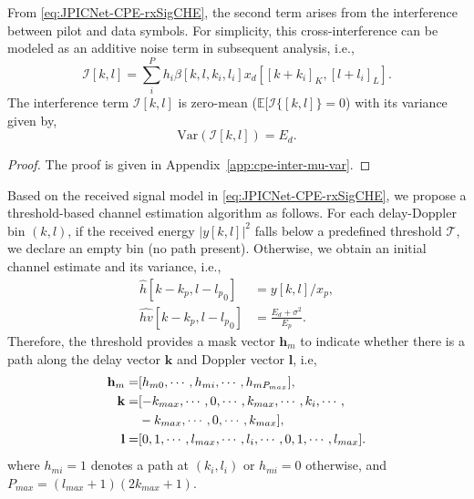\documentclass[journal]{IEEEtran}
\begin{document}
From \eqref{eq:JPICNet-CPE-rxSigCHE}, the second term arises from the interference between pilot and data symbols. For simplicity, this cross-interference can be modeled as an additive noise term in subsequent analysis, i.e.,
\begin{equation}
\mathcal{I}[k, l] = \sum_i^P h_i \beta[k, l, k_i, l_i] x_d[[k+k_i]_K, [l+l_i]_L].
\end{equation}
The interference term $\mathcal{I}[k, l]$ is zero-mean ($\mathbb{E}[\mathcal{I}\{[k, l]\}=0$) with its variance given by,
\begin{equation}
\text{Var}(\mathcal{I}[k, l]) = E_d.
\end{equation}
\begin{proof}
The proof is given in Appendix~\ref{app:cpe-inter-mu-var}.
\end{proof}

Based on the received signal model in \eqref{eq:JPICNet-CPE-rxSigCHE}, we propose a threshold-based channel estimation algorithm as follows. For each delay-Doppler bin $(k,l)$, if the received energy $|y[k, l]|^2$ falls below a predefined threshold $\mathcal{T}$, we declare an empty bin (no path present). Otherwise, we obtain an initial channel estimate and its variance, i.e.,
\begin{subequations}
\begin{align}
\hat{h}[k - k_p, l-{l_p}_0] &= y[k,l]/x_p, \label{eq:CPE-h} \\
\hat{hv}[k - k_p, l-{l_p}_0] &= \frac{E_d + \sigma^2}{E_p}. \label{eq:CPE-hv}
\end{align}
\end{subequations}
Therefore, the threshold provides a mask vector $\mathbf h_m$ to indicate whether there is a path along the delay vector $\mathbf k$ and Doppler vector $\mathbf l$, i.e,
\begin{subequations}
\begin{align}
\mathbf  h_m = & [h_{m0}, \cdots, h_{mi}, \cdots, h_{mP_{max}}], \label{eq:CPE-hm} \\
\mathbf  k = & [-k_{max}, \cdots, 0, \cdots, k_{max}, \cdots, k_{i}, \cdots, \notag\\
&-k_{max}, \cdots, 0, \cdots, k_{max}],\label{eq:CPE-km} \\
\mathbf  l = & [0, 1, \cdots, l_{max}, \cdots, l_{i}, \cdots, 0, 1, \cdots, l_{max}]. \label{eq:CPE-lm}
\end{align}
\end{subequations}
where $h_{mi} = 1 $ denotes a path at $( k_{i}, l_{i})$ or $h_{mi} = 0$ otherwise, and $P_{max} = (l_{max}+1)(2k_{max}+1)$.
\end{document}
